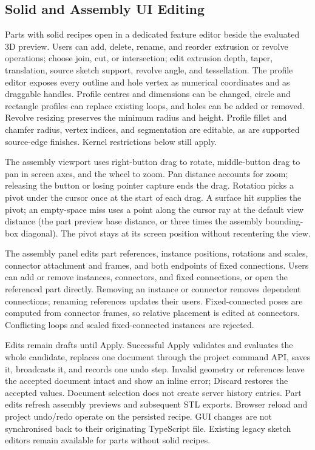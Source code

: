 \documentclass[11pt]{article}
\begin{document}
\subsection{Solid and Assembly UI Editing}

Parts with solid recipes open in a dedicated feature editor beside the evaluated
3D preview. Users can add, delete, rename, and reorder extrusion or revolve
operations; choose join, cut, or intersection; edit extrusion depth, taper,
translation, source sketch support, revolve angle, and tessellation. The profile
editor exposes every outline and hole vertex as numerical coordinates and as
 draggable handles. Profile centres and dimensions can be changed, circle and
rectangle profiles can replace existing loops, and holes can be added or removed.
Revolve resizing preserves the minimum radius and height. Profile fillet and
chamfer radius, vertex indices, and segmentation are editable, as are supported
source-edge finishes. Kernel restrictions below still apply.

The assembly viewport uses right-button drag to rotate, middle-button drag to
pan in screen axes, and the wheel to zoom. Pan distance accounts for zoom;
releasing the button or losing pointer capture ends the drag.
Rotation picks a pivot under the cursor once at the start of each drag. A surface hit supplies the pivot; an empty-space miss uses a point along the cursor ray at the default view distance (the part preview base distance, or three times the assembly bounding-box diagonal). The pivot stays at its screen position without recentering the view.

The assembly panel edits part references, instance positions, rotations and
scales, connector attachment and frames, and both endpoints of fixed connections.
Users can add or remove instances, connectors, and fixed connections, or open the
referenced part directly. Removing an instance or connector removes dependent
connections; renaming references updates their users. Fixed-connected poses are
computed from connector frames, so relative placement is edited at connectors.
Conflicting loops and scaled fixed-connected instances are rejected.

Edits remain drafts until Apply. Successful Apply validates and evaluates the
whole candidate, replaces one document through the project command API, saves it,
broadcasts it, and records one undo step. Invalid geometry or references leave the
accepted document intact and show an inline error; Discard restores the accepted
values. Document selection does not create server history entries. Part edits
refresh assembly previews and subsequent STL exports. Browser reload and project
undo/redo operate on the persisted recipe. GUI changes are not synchronised back
to their originating TypeScript file. Existing legacy sketch editors remain
available for parts without solid recipes.
\end{document}
